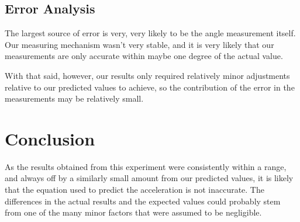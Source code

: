 \subsection{Error Analysis}

The largest source of error is very, very likely to be the angle measurement itself.
Our measuring mechanism wasn't very stable, and it is very likely that our measurements are only accurate within maybe one degree of the actual value.

With that said, however, our results only required relatively minor adjustments relative to our predicted values to achieve, so the contribution of the error in the measurements may be relatively small.

\section{Conclusion}

As the results obtained from this experiment were consistently within a range, and always off by a similarly small amount from our predicted values, it is likely that the equation used to predict
the acceleration is not inaccurate.
The differences in the actual results and the expected values could probably stem from one of the many minor factors that were assumed to be negligible.


